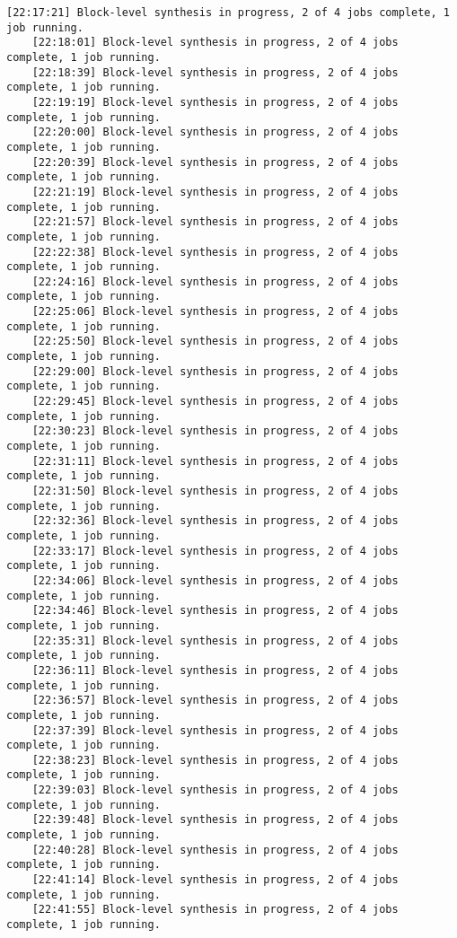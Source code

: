\begin{lstlisting}[caption=Содержимое файла v++\_vinc.log для измененного проекта, label={log2}]
	[22:17:21] Block-level synthesis in progress, 2 of 4 jobs complete, 1 job running.
	[22:18:01] Block-level synthesis in progress, 2 of 4 jobs complete, 1 job running.
	[22:18:39] Block-level synthesis in progress, 2 of 4 jobs complete, 1 job running.
	[22:19:19] Block-level synthesis in progress, 2 of 4 jobs complete, 1 job running.
	[22:20:00] Block-level synthesis in progress, 2 of 4 jobs complete, 1 job running.
	[22:20:39] Block-level synthesis in progress, 2 of 4 jobs complete, 1 job running.
	[22:21:19] Block-level synthesis in progress, 2 of 4 jobs complete, 1 job running.
	[22:21:57] Block-level synthesis in progress, 2 of 4 jobs complete, 1 job running.
	[22:22:38] Block-level synthesis in progress, 2 of 4 jobs complete, 1 job running.
	[22:24:16] Block-level synthesis in progress, 2 of 4 jobs complete, 1 job running.
	[22:25:06] Block-level synthesis in progress, 2 of 4 jobs complete, 1 job running.
	[22:25:50] Block-level synthesis in progress, 2 of 4 jobs complete, 1 job running.
	[22:29:00] Block-level synthesis in progress, 2 of 4 jobs complete, 1 job running.
	[22:29:45] Block-level synthesis in progress, 2 of 4 jobs complete, 1 job running.
	[22:30:23] Block-level synthesis in progress, 2 of 4 jobs complete, 1 job running.
	[22:31:11] Block-level synthesis in progress, 2 of 4 jobs complete, 1 job running.
	[22:31:50] Block-level synthesis in progress, 2 of 4 jobs complete, 1 job running.
	[22:32:36] Block-level synthesis in progress, 2 of 4 jobs complete, 1 job running.
	[22:33:17] Block-level synthesis in progress, 2 of 4 jobs complete, 1 job running.
	[22:34:06] Block-level synthesis in progress, 2 of 4 jobs complete, 1 job running.
	[22:34:46] Block-level synthesis in progress, 2 of 4 jobs complete, 1 job running.
	[22:35:31] Block-level synthesis in progress, 2 of 4 jobs complete, 1 job running.
	[22:36:11] Block-level synthesis in progress, 2 of 4 jobs complete, 1 job running.
	[22:36:57] Block-level synthesis in progress, 2 of 4 jobs complete, 1 job running.
	[22:37:39] Block-level synthesis in progress, 2 of 4 jobs complete, 1 job running.
	[22:38:23] Block-level synthesis in progress, 2 of 4 jobs complete, 1 job running.
	[22:39:03] Block-level synthesis in progress, 2 of 4 jobs complete, 1 job running.
	[22:39:48] Block-level synthesis in progress, 2 of 4 jobs complete, 1 job running.
	[22:40:28] Block-level synthesis in progress, 2 of 4 jobs complete, 1 job running.
	[22:41:14] Block-level synthesis in progress, 2 of 4 jobs complete, 1 job running.
	[22:41:55] Block-level synthesis in progress, 2 of 4 jobs complete, 1 job running.

\end{lstlisting}
